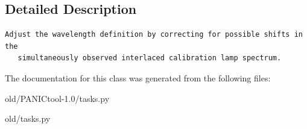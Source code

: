 \subsection{Detailed Description}


\footnotesize\begin{verbatim}Adjust the wavelength definition by correcting for possible shifts in the
   simultaneously observed interlaced calibration lamp spectrum.
\end{verbatim}
\normalsize
 



The documentation for this class was generated from the following files:\begin{CompactItemize}
\item 
old/PANICtool-1.0/tasks.py\item 
old/tasks.py\end{CompactItemize}
